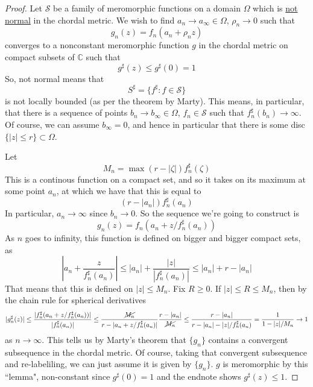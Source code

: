 \documentclass{article}
\newcommand{\mbb}[1]{\mathbb{#1}}
\newcommand{\mc}[1]{\mathcal{#1}}
\begin{document}
\begin{proof}
Let \(\mc{S}\) be a family of meromorphic functions on a domain \(\Omega\) which is \underline{not normal} in the chordal metric. We wish to find \(a_n \to a_\infty \in \Omega\), \(\rho_n \to 0\) such that
\begin{equation}g_n(z) = f_n(a_n + \rho_n z)\end{equation}
converges to a nonconstant meromorphic function \(g\) in the chordal metric on compact subsets of \(\mbb{C}\) such that
\begin{equation}g^\sharp(z) \leq g^\sharp(0) = 1\end{equation}
So, not normal means that
\begin{equation}S^\sharp = \{f^\sharp: f \in \mc{S}\}\end{equation}
is not locally bounded (as per the theorem by Marty). This means, in particular, that there is a sequence of points \(b_n \to b_\infty \in \Omega\), \(f_n \in \mc{S}\) such that \(f_n^\sharp(b_n) \to \infty\). Of course, we can assume \(b_\infty = 0\), and hence in particular that there is some disc \(\{|z| \leq r\} \subset \Omega\).

Let
\begin{equation}M_n = \max(r - |\zeta|)f_n^\sharp(\zeta)\end{equation}
This is a continous function on a compact set, and so it takes on its maximum at some point \(a_n\), at which we have that this is equal to
\begin{equation}(r - |a_n|)f_n^\sharp(a_n)\end{equation}
In particular, \(a_n \to \infty\) since \(b_n \to 0\). So the sequence we're going to construct is
\begin{equation}g_n(z) = f_n(a_n + z/f_n^\sharp(a_n))\end{equation}
As \(n\) goes to infinity, this function is defined on bigger and bigger compact sets, as
\begin{equation}\left|a_n + \frac{z}{f_n^\sharp(a_n)}\right| \leq |a_n| + \frac{|z|}{|f_n^\sharp(a_n)|} \leq |a_n| + r - |a_n|\end{equation}
That means that this is defined on \(|z| \leq M_n\). Fix \(R \geq 0\). If \(|z| \leq R \leq M_n\), then by the chain rule for spherical derivatives
\begin{equation}|g_n^\sharp(z)| \leq \frac{|f_n^\sharp(a_n + z/f_n^\sharp(a_n))|}{|f_n^\sharp(a_n)|} \leq \frac{\cancel{M_n}}{r - |a_n + z/f_n^\sharp(a_n)|}\frac{r - |a_n|}{\cancel{M_n}} \leq \frac{r - |a_n|}{r - |a_n| - |z|/f_n^\sharp(a_n)} = \frac{1}{1  - |z|/M_n} \to 1\end{equation}
as \(n \to \infty\). This tells us by Marty's theorem that \(\{g_n\}\) contains a convergent subsequence in the chordal metric. Of course, taking that convergent subsequence and re-labeliling, we can just assume it is given by \(\{g_n\}\). \(g\) is meromorphic by this ``lemma", non-constant since \(g^\sharp(0) = 1\) and the endnote shows \(g^\sharp(z) \leq 1\).
\end{proof}
\end{document}
